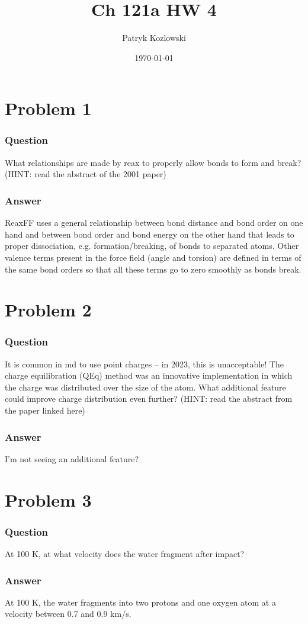 \documentclass[12pt]{article}
\title{Ch 121a HW 4}
\author{Patryk Kozlowski}
\date{\today}
\begin{document}
\maketitle
\section{Problem 1}
\subsubsection{Question}
 What relationships are made by reax to properly allow bonds to form and break? (HINT: read the abstract of the 2001 paper)
\subsubsection{Answer}
ReaxFF uses a general relationship between bond distance and bond order on one hand and between bond order and bond energy on the other hand that leads to proper dissociation, e.g. formation/breaking, of bonds to separated atoms. Other valence terms present in the force field (angle and torsion) are defined in terms of the same bond orders so that all these terms go to zero smoothly as bonds break.
\section{Problem 2}
\subsubsection{Question}
It is common in md to use point charges – in 2023, this is unacceptable! The charge equilibration (QEq) method was an innovative implementation in which the charge was distributed over the size of the atom. What additional feature could improve charge distribution even further? (HINT: read the abstract from the paper linked here)
\subsubsection{Answer}
I'm not seeing an additional feature?
\section{Problem 3}
\subsubsection{Question}
At 100 K, at what velocity does the water fragment after impact?
\subsubsection{Answer}
At 100 K, the water fragments into two protons and one oxygen atom at a velocity between 0.7 and 0.9 km/s.
\end{document}
